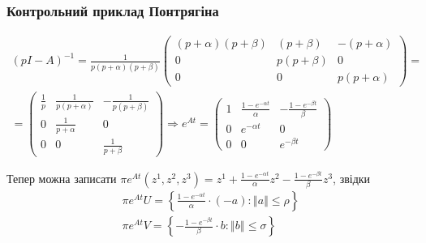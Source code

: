 \documentclass[10pt,pdf]{beamer}
\renewcommand{\l}{\left}
\renewcommand{\r}{\right}
\newcommand{\norm}[1]{\left\Vert #1 \right\Vert}
\begin{document}
    \begin{frame}
        \frametitle{Контрольний приклад Понтрягіна}

        \begin{gather*}
            (pI - A)^{-1} = \frac{1}{p(p+\alpha)(p+\beta)}\begin{pmatrix}
                (p+\alpha)(p+\beta) & (p+\beta) & -(p+\alpha) \\
                0 & p(p+\beta) & 0 \\
                0 & 0 & p(p+\alpha)
            \end{pmatrix} = \\ =
            \begin{pmatrix}
                \frac{1}{p} & \frac{1}{p(p+\alpha)} & - \frac{1}{p(p+\beta)} \\
                0 & \frac{1}{p+\alpha} & 0 \\
                0 & 0 & \frac{1}{p+\beta}
            \end{pmatrix} \Rightarrow
            e^{At} = \begin{pmatrix}
                1 & \frac{1 - e^{-\alpha t}}{\alpha} & -\frac{1 - e^{-\beta t}}{\beta} \\
                0 & e^{-\alpha t} & 0 \\
                0 & 0 & e^{-\beta t}
            \end{pmatrix}
        \end{gather*}   

        Тепер можна записати $\pi e^{At}(z^1, z^2, z^3) = z^1 + \frac{1 - e^{-\alpha t}}{\alpha} z^2 - \frac{1 - e^{-\beta t}}{\beta}z^3$, звідки
        \begin{gather*}
            \pi e^{At} U = \l\{\frac{1 - e^{-\alpha t}}{\alpha} \cdot (-a) : \norm{a} \leq \rho\r\} \\ 
            \pi e^{At} V = \l\{-\frac{1 - e^{-\beta t}}{\beta} \cdot b : \norm{b} \leq \sigma\r\}
        \end{gather*}
    \end{frame}
\end{document}
